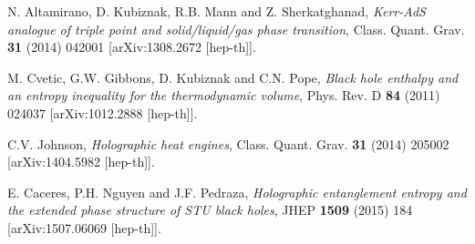 \documentclass[superscriptaddress, prd, aps,amsmath,amssymb,showpacs,showkeys, onecolumn]{revtex4-2}
\begin{document}
\begin{thebibliography}{99}
N. Altamirano, D. Kubiznak, R.B. Mann and Z. Sherkatghanad, \emph{Kerr-AdS analogue of triple point and solid/liquid/gas phase transition}, Class. Quant. Grav. \textbf{31} (2014) 042001 [arXiv:1308.2672 [hep-th]].

M. Cvetic, G.W. Gibbons, D. Kubiznak and C.N. Pope, \emph{Black hole enthalpy and an entropy inequality for the thermodynamic volume}, Phys. Rev. D \textbf{84} (2011) 024037 [arXiv:1012.2888 [hep-th]].

C.V. Johnson, \emph{Holographic heat engines}, Class. Quant. Grav. \textbf{31} (2014) 205002 [arXiv:1404.5982 [hep-th]].

E. Caceres, P.H. Nguyen and J.F. Pedraza, \emph{Holographic entanglement entropy and the extended phase structure of STU black holes}, JHEP \textbf{1509} (2015) 184 [arXiv:1507.06069 [hep-th]].

\end{thebibliography}
\end{document}
